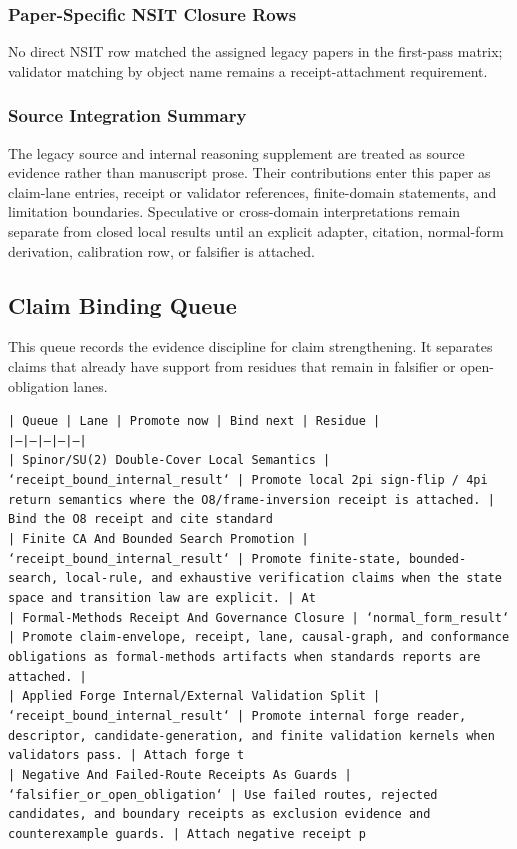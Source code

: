 \documentclass[11pt]{article}
\begin{document}
\subsubsection*{Paper-Specific NSIT Closure Rows}

No direct NSIT row matched the assigned legacy papers in the first-pass matrix; validator matching by object name remains a receipt-attachment requirement.

\subsubsection*{Source Integration Summary}

The legacy source and internal reasoning supplement are treated as source
evidence rather than manuscript prose. Their contributions enter this paper as
claim-lane entries, receipt or validator references, finite-domain statements,
and limitation boundaries. Speculative or cross-domain interpretations remain
separate from closed local results until an explicit adapter, citation,
normal-form derivation, calibration row, or falsifier is attached.
\subsection*{Claim Binding Queue}

This queue records the evidence discipline for claim strengthening. It separates claims that already have support from residues that remain in falsifier or open-obligation lanes.

\noindent\texttt{| Queue | Lane | Promote now | Bind next | Residue |}\\
\noindent\texttt{|---|---|---|---|---|}\\
\noindent\texttt{| Spinor/SU(2) Double-Cover Local Semantics | `receipt\_bound\_internal\_result` | Promote local 2pi sign-flip / 4pi return semantics where the O8/frame-inversion receipt is attached. | Bind the O8 receipt and cite standard}\\
\noindent\texttt{| Finite CA And Bounded Search Promotion | `receipt\_bound\_internal\_result` | Promote finite-state, bounded-search, local-rule, and exhaustive verification claims when the state space and transition law are explicit. | At}\\
\noindent\texttt{| Formal-Methods Receipt And Governance Closure | `normal\_form\_result` | Promote claim-envelope, receipt, lane, causal-graph, and conformance obligations as formal-methods artifacts when standards reports are attached. |}\\
\noindent\texttt{| Applied Forge Internal/External Validation Split | `receipt\_bound\_internal\_result` | Promote internal forge reader, descriptor, candidate-generation, and finite validation kernels when validators pass. | Attach forge t}\\
\noindent\texttt{| Negative And Failed-Route Receipts As Guards | `falsifier\_or\_open\_obligation` | Use failed routes, rejected candidates, and boundary receipts as exclusion evidence and counterexample guards. | Attach negative receipt p}\\
\end{document}
